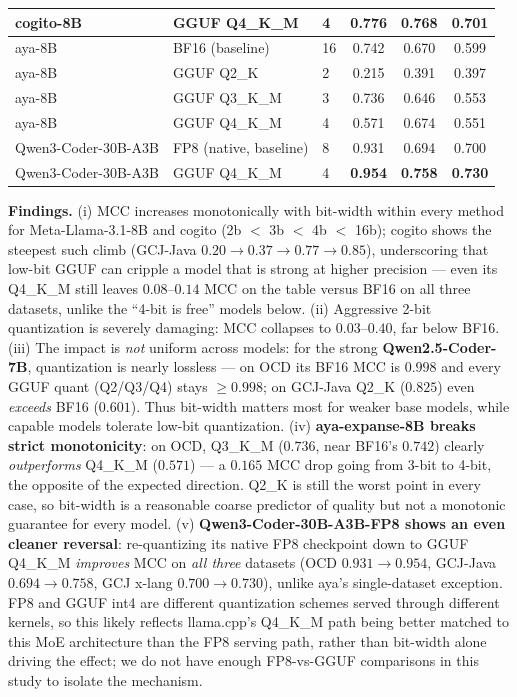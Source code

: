 \documentclass[11pt]{article}
\newcommand{\best}[1]{\textbf{#1}}
\begin{document}
\begin{table}[htbp]
\begin{tabular}{lllccc}
    cogito-8B    & GGUF Q4\_K\_M        & 4  & 0.776 & 0.768 & 0.701 \\
    \midrule
    aya-8B       & BF16 (baseline)      & 16 & 0.742 & 0.670 & 0.599 \\
    \midrule
    aya-8B       & GGUF Q2\_K           & 2  & 0.215 & 0.391 & 0.397 \\
    aya-8B       & GGUF Q3\_K\_M        & 3  & 0.736 & 0.646 & 0.553 \\
    aya-8B       & GGUF Q4\_K\_M        & 4  & 0.571 & 0.674 & 0.551 \\
    \midrule
    Qwen3-Coder-30B-A3B & FP8 (native, baseline) & 8 & 0.931 & 0.694 & 0.700 \\
    Qwen3-Coder-30B-A3B & GGUF Q4\_K\_M          & 4 & \best{0.954} & \best{0.758} & \best{0.730} \\
    \bottomrule
  \end{tabular}
\end{table}

\noindent\textbf{Findings.} (i) MCC increases monotonically with
bit-width within every method for Meta-Llama-3.1-8B and cogito (2b $<$ 3b $<$
4b $<$ 16b); cogito shows the steepest such climb (GCJ-Java
$0.20\!\rightarrow\!0.37\!\rightarrow\!0.77\!\rightarrow\!0.85$), underscoring
that low-bit GGUF can cripple a model that is strong at higher precision ---
even its Q4\_K\_M still leaves $0.08$--$0.14$ MCC on the table versus BF16 on
all three datasets, unlike the ``4-bit is free'' models below. (ii) Aggressive 2-bit quantization
is severely damaging: MCC collapses to $0.03$--$0.40$, far below BF16. (iii)
The impact is \emph{not} uniform across models: for the strong
\textbf{Qwen2.5-Coder-7B}, quantization is nearly lossless --- on OCD its BF16
MCC is $0.998$ and every GGUF quant (Q2/Q3/Q4) stays $\ge 0.998$; on GCJ-Java
Q2\_K ($0.825$) even \emph{exceeds} BF16 ($0.601$). Thus bit-width matters most
for weaker base models, while capable models tolerate low-bit quantization.
(iv) \textbf{aya-expanse-8B breaks strict monotonicity}: on OCD, Q3\_K\_M
($0.736$, near BF16's $0.742$) clearly \emph{outperforms} Q4\_K\_M ($0.571$) ---
a $0.165$ MCC drop going from 3-bit to 4-bit, the opposite of the expected
direction. Q2\_K is still the worst point in every case, so bit-width is a
reasonable coarse predictor of quality but not a monotonic guarantee for every
model. (v) \textbf{Qwen3-Coder-30B-A3B-FP8 shows an even cleaner reversal}:
re-quantizing its native FP8 checkpoint down to GGUF Q4\_K\_M \emph{improves}
MCC on \emph{all three} datasets (OCD $0.931\!\rightarrow\!0.954$, GCJ-Java
$0.694\!\rightarrow\!0.758$, GCJ x-lang $0.700\!\rightarrow\!0.730$), unlike
aya's single-dataset exception. FP8 and GGUF int4 are different quantization
schemes served through different kernels, so this likely reflects llama.cpp's
Q4\_K\_M path being better matched to this MoE architecture than the FP8
serving path, rather than bit-width alone driving the effect; we do not have
enough FP8-vs-GGUF comparisons in this study to isolate the mechanism.
\end{document}
